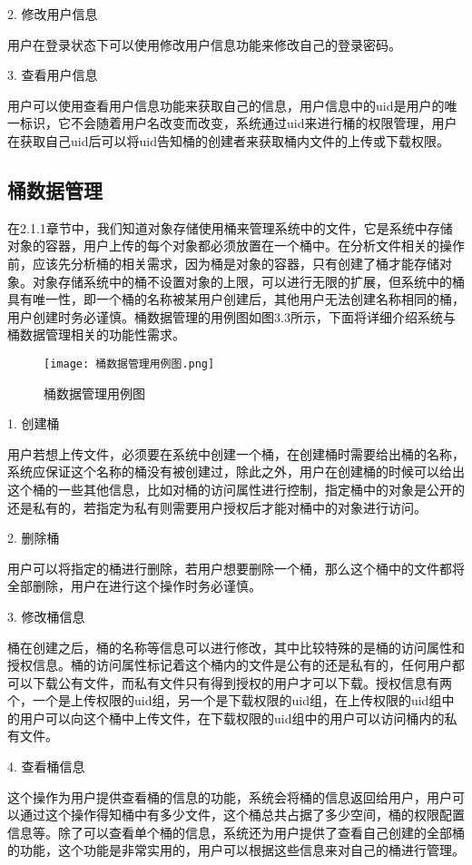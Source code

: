 2. 修改用户信息

用户在登录状态下可以使用修改用户信息功能来修改自己的登录密码。

3. 查看用户信息

用户可以使用查看用户信息功能来获取自己的信息，用户信息中的uid是用户的唯一标识，它不会随着用户名改变而改变，系统通过uid来进行桶的权限管理，用户在获取自己uid后可以将uid告知桶的创建者来获取桶内文件的上传或下载权限。

\subsection{桶数据管理}
在2.1.1章节中，我们知道对象存储使用桶来管理系统中的文件，它是系统中存储对象的容器，用户上传的每个对象都必须放置在一个桶中。在分析文件相关的操作前，应该先分析桶的相关需求，因为桶是对象的容器，只有创建了桶才能存储对象。对象存储系统中的桶不设置对象的上限，可以进行无限的扩展，但系统中的桶具有唯一性，即一个桶的名称被某用户创建后，其他用户无法创建名称相同的桶，用户创建时务必谨慎。桶数据管理的用例图如图3.3所示，下面将详细介绍系统与桶数据管理相关的功能性需求。

\begin{figure}[h]
    \centering
    \texttt{[image: 桶数据管理用例图.png]}
    \caption{桶数据管理用例图}
\end{figure}

1. 创建桶

用户若想上传文件，必须要在系统中创建一个桶，在创建桶时需要给出桶的名称，系统应保证这个名称的桶没有被创建过，除此之外，用户在创建桶的时候可以给出这个桶的一些其他信息，比如对桶的访问属性进行控制，指定桶中的对象是公开的还是私有的，若指定为私有则需要用户授权后才能对桶中的对象进行访问。

2. 删除桶

用户可以将指定的桶进行删除，若用户想要删除一个桶，那么这个桶中的文件都将全部删除，用户在进行这个操作时务必谨慎。

3. 修改桶信息

桶在创建之后，桶的名称等信息可以进行修改，其中比较特殊的是桶的访问属性和授权信息。桶的访问属性标记着这个桶内的文件是公有的还是私有的，任何用户都可以下载公有文件，而私有文件只有得到授权的用户才可以下载。授权信息有两个，一个是上传权限的uid组，另一个是下载权限的uid组，在上传权限的uid组中的用户可以向这个桶中上传文件，在下载权限的uid组中的用户可以访问桶内的私有文件。

4. 查看桶信息

这个操作为用户提供查看桶的信息的功能，系统会将桶的信息返回给用户，用户可以通过这个操作得知桶中有多少文件，这个桶总共占据了多少空间，桶的权限配置信息等。除了可以查看单个桶的信息，系统还为用户提供了查看自己创建的全部桶的功能，这个功能是非常实用的，用户可以根据这些信息来对自己的桶进行管理。

